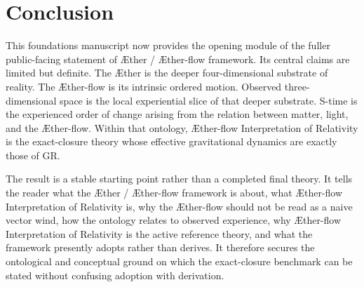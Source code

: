 \documentclass[11pt]{article}
\newcommand{\Aether}{\AE{}ther}
\newcommand{\Aflow}{\AE{}ther-flow}
\newcommand{\TheoryName}{\Aflow{} Interpretation of Relativity}
\newcommand{\TheoryProgram}{\Aether{} / \Aflow{} framework}
\begin{document}
\section{Conclusion}

This foundations manuscript now provides the opening module of the fuller public-facing statement of \TheoryProgram{}. Its central claims are limited but definite. The \Aether{} is the deeper four-dimensional substrate of reality. The \Aflow{} is its intrinsic ordered motion. Observed three-dimensional space is the local experiential slice of that deeper substrate. S-time is the experienced order of change arising from the relation between matter, light, and the \Aflow{}. Within that ontology, \TheoryName{} is the exact-closure theory whose effective gravitational dynamics are exactly those of GR.

The result is a stable starting point rather than a completed final theory. It tells the reader what the \TheoryProgram{} is about, what \TheoryName{} is, why the \Aflow{} should not be read as a naive vector wind, how the ontology relates to observed experience, why \TheoryName{} is the active reference theory, and what the framework presently adopts rather than derives. It therefore secures the ontological and conceptual ground on which the exact-closure benchmark can be stated without confusing adoption with derivation.


\end{document}
